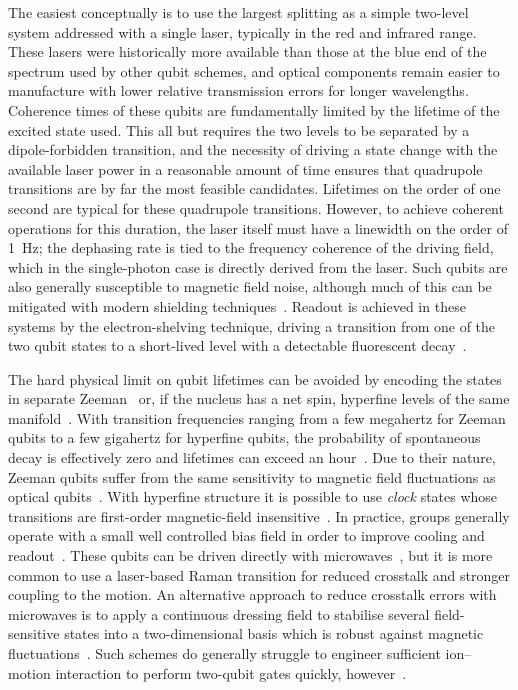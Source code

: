 The easiest conceptually is to use the largest splitting as a simple two-level system addressed with a single laser, typically in the red and infrared range.
These lasers were historically more available than those at the blue end of the spectrum used by other qubit schemes, and optical components remain easier to manufacture with lower relative transmission errors for longer wavelengths.
Coherence times of these qubits are fundamentally limited by the lifetime of the excited state used.
This all but requires the two levels to be separated by a dipole-forbidden transition, and the necessity of driving a state change with the available laser power in a reasonable amount of time ensures that quadrupole transitions are by far the most feasible candidates.
Lifetimes on the order of one second are typical for these quadrupole transitions.
However, to achieve coherent operations for this duration, the laser itself must have a linewidth on the order of \qty{1}{\Hz}; the dephasing rate is tied to the frequency coherence of the driving field, which in the single-photon case is directly derived from the laser.
Such qubits are also generally susceptible to magnetic field noise, although much of this can be mitigated with modern shielding techniques~\cite{Ruster2016}.
Readout is achieved in these systems by the electron-shelving technique, driving a transition from one of the two qubit states to a short-lived level with a detectable fluorescent decay~\cite{Sauter1986,Nagourney1986}.

The hard physical limit on qubit lifetimes can be avoided by encoding the states in separate Zeeman~\cite{Home2006a,Poschinger2009} or, if the nucleus has a net spin, hyperfine levels of the same manifold~\cite{Monroe1995,Turchette1998}.
With transition frequencies ranging from a few megahertz for Zeeman qubits to a few gigahertz for hyperfine qubits, the probability of spontaneous decay is effectively zero and lifetimes can exceed an hour~\cite{Wang2017,Wang2021}.
Due to their nature, Zeeman qubits suffer from the same sensitivity to magnetic field fluctuations as optical qubits~\cite{Ruster2016}.
With hyperfine structure it is possible to use \emph{clock} states whose transitions are first-order magnetic-field insensitive~\cite{Olmschenk2007,Harty2014}.
In practice, groups generally operate with a small well controlled bias field in order to improve cooling and readout~\cite{Debnath2016,Pino2021}.
These qubits can be driven directly with microwaves~\cite{Mintert2001,Harty2016}, but it is more common to use a laser-based Raman transition for reduced crosstalk and stronger coupling to the motion.
An alternative approach to reduce crosstalk errors with microwaves is to apply a continuous dressing field to stabilise several field-sensitive states into a two-dimensional basis which is robust against magnetic fluctuations~\cite{Timoney2011,Webster2013}.
Such schemes do generally struggle to engineer sufficient ion--motion interaction to perform two-qubit gates quickly, however~\cite{Weidt2016}.

